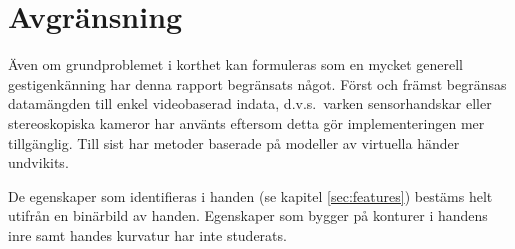 \documentclass[../rapport_MVEX01-11-05]{subfiles}
\begin{document}
\section{Avgränsning}
Även om grundproblemet i korthet kan formuleras som en mycket generell
gestigenkänning har denna rapport begränsats något. Först och främst
begränsas datamängden till enkel videobaserad indata, d.v.s.~varken sensorhandskar
eller stereoskopiska kameror har använts eftersom detta gör implementeringen mer
tillgänglig. Till sist har metoder baserade på modeller av virtuella händer
undvikits.

De egenskaper som identifieras i handen (se kapitel
\ref{sec:features}) bestäms helt utifrån en binärbild av
handen. Egenskaper som bygger på konturer i handens inre samt handes
kurvatur har inte studerats.
\end{document}
